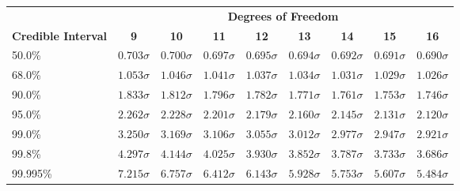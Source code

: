 \begin{center}
\begin{tabular}{p{0.75in}cccccccc}
 & \multicolumn{8}{c}{\bf Degrees of Freedom} \\
{\bf Credible Interval} & {\bf 9} & {\bf 10} & {\bf 11} & {\bf 12} & {\bf 13} & {\bf 14} & {\bf 15} & {\bf 16}\\
50.0\%& $ 0.703 \sigma$& $ 0.700 \sigma$& $ 0.697 \sigma$& $ 0.695 \sigma$& $ 0.694 \sigma$& $ 0.692 \sigma$& $ 0.691 \sigma$& $ 0.690 \sigma$\\
68.0\%& $ 1.053 \sigma$& $ 1.046 \sigma$& $ 1.041 \sigma$& $ 1.037 \sigma$& $ 1.034 \sigma$& $ 1.031 \sigma$& $ 1.029 \sigma$& $ 1.026 \sigma$\\
90.0\%& $ 1.833 \sigma$& $ 1.812 \sigma$& $ 1.796 \sigma$& $ 1.782 \sigma$& $ 1.771 \sigma$& $ 1.761 \sigma$& $ 1.753 \sigma$& $ 1.746 \sigma$\\
95.0\%& $ 2.262 \sigma$& $ 2.228 \sigma$& $ 2.201 \sigma$& $ 2.179 \sigma$& $ 2.160 \sigma$& $ 2.145 \sigma$& $ 2.131 \sigma$& $ 2.120 \sigma$\\
99.0\%& $ 3.250 \sigma$& $ 3.169 \sigma$& $ 3.106 \sigma$& $ 3.055 \sigma$& $ 3.012 \sigma$& $ 2.977 \sigma$& $ 2.947 \sigma$& $ 2.921 \sigma$\\
99.8\%& $ 4.297 \sigma$& $ 4.144 \sigma$& $ 4.025 \sigma$& $ 3.930 \sigma$& $ 3.852 \sigma$& $ 3.787 \sigma$& $ 3.733 \sigma$& $ 3.686 \sigma$\\
99.995\%& $ 7.215 \sigma$& $ 6.757 \sigma$& $ 6.412 \sigma$& $ 6.143 \sigma$& $ 5.928 \sigma$& $ 5.753 \sigma$& $ 5.607 \sigma$& $ 5.484 \sigma$\\
\end{tabular}
\end{center}
